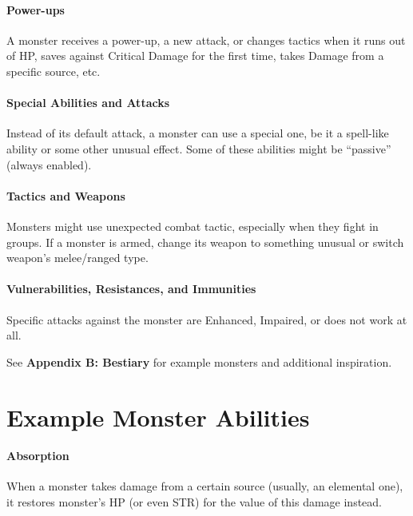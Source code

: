 \documentclass[itdr]{subfiles}
\begin{document}
\paragraph{Power-ups}
A monster receives a power-up, a new attack, or changes tactics when it runs out of HP, saves against Critical Damage for the first time, takes Damage from a specific source, etc.

\paragraph{Special Abilities and Attacks}
Instead of its default attack, a monster can use a special one, be it a spell-like ability or some other unusual effect. Some of these abilities might be ``passive'' (always enabled).

\paragraph{Tactics and Weapons}
Monsters might use unexpected combat tactic, especially when they fight in groups. If a monster is armed, change its weapon to something unusual or switch weapon's melee/ranged type.

\paragraph{Vulnerabilities, Resistances, and Immunities}
Specific attacks against the monster are Enhanced, Impaired, or does not work at all.

\vfill

\begin{dbox}
	See \textbf{Appendix B: Bestiary} for example monsters and additional inspiration.
\end{dbox}

\vfill

\break

\section{Example Monster Abilities}

\paragraph{Absorption}
When a monster takes damage from a certain source (usually, an elemental one), it restores monster's HP (or even STR) for the value of this damage instead.
\end{document}
